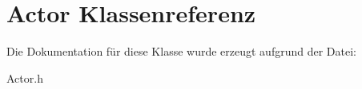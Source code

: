 \hypertarget{class_actor}{\section{Actor Klassenreferenz}
\label{class_actor}
}


Die Dokumentation für diese Klasse wurde erzeugt aufgrund der Datei\-:\begin{DoxyCompactItemize}
\item 
Actor.\-h\end{DoxyCompactItemize}
